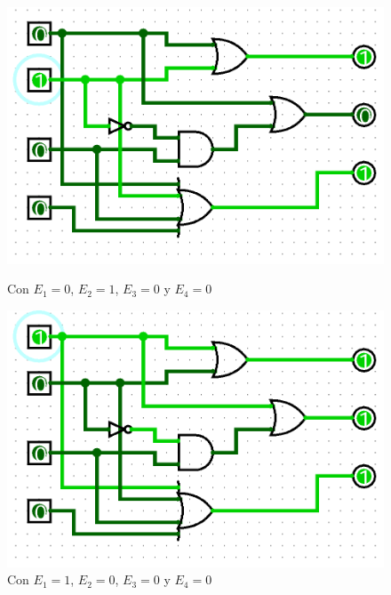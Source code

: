 \newpage
\begin{figure}
	\centering
    \includegraphics[height = 0.25\textheight]{recursos/Ejercicio4/4ej4.png}\par
    \caption*{Con $E_{1}=0$, $E_{2}=1$, $E_{3}=0$ y $E_{4}=0$}
    \includegraphics[height = 0.25\textheight]{recursos/Ejercicio4/5ej4.png}\par
    \caption*{Con $E_{1}=1$, $E_{2}=0$, $E_{3}=0$ y $E_{4}=0$}
\end{figure}
